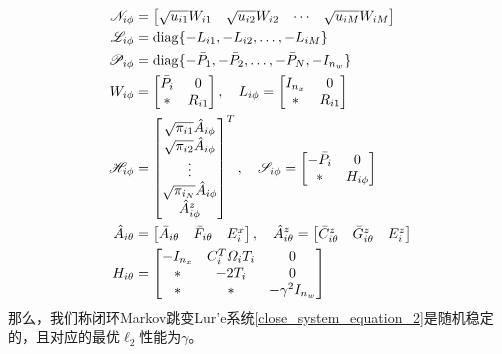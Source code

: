 	\begin{equation}\notag
	\begin{aligned}
	\mathscr{N}_{i\phi}&=\begin{bmatrix}
	\sqrt{u_{i1}}W_{i1}&\sqrt{u_{i2}}W_{i2}&\cdots&\sqrt{u_{iM}}W_{iM}
	\end{bmatrix}\\
	\mathscr{L}_{i\phi}&=\mathrm{diag} \{-L_{i1},-L_{i2},\dots,-L_{iM}  \}\\
	\mathscr{P}_{i\phi}&=\mathrm{diag}\{-\bar{P}_{1},-\bar{P}_{2},\dots,-\bar{P}_{N},-I_{n_w}  \}\\
	W_{i\phi}&=\begin{bmatrix}
	\bar{P}_{i}&0\\
	*&R_{i1}
	\end{bmatrix}, \quad
	L_{i\phi}=\begin{bmatrix}
	I_{n_x}&0\\
	*&R_{i1}
	\end{bmatrix}\\
	\mathscr{H}_{i\phi}&=\begin{bmatrix}
	\sqrt{\pi_{i1}}\hat{A}_{i\phi}\\
	\sqrt{\pi_{i2}}\hat{A}_{i\phi}\\
	\vdots\\
	\sqrt{\pi_{i_N}}\hat{A}_{i\phi}\\
	\hat{A}^{z}_{i\phi}
	\end{bmatrix}^{T}, \quad
	\mathscr{S}_{i\phi}=\begin{bmatrix}
	-\bar{P}_{i}&0\\
	*&H_{i\phi}
	\end{bmatrix}\\
	\hat{A}_{i\theta}&=\begin{bmatrix}
	\bar{A}_{i\theta}&\bar{F}_{i\theta}&E^{x}_{i}
	\end{bmatrix},\quad
	\hat{A}^{z}_{i\theta}=\begin{bmatrix}
	\bar{C}^{z}_{i\theta}&\bar{G}^{z}_{i\theta}&E^{z}_{i}
	\end{bmatrix}  \\
	H_{i\theta}&=\begin{bmatrix}
	-I_{n_x}&C^{T}_{i}\varOmega_{i}T_{i}&0\\
	*&-2T_{i}&0\\
	*&*&-\gamma^{2}I_{n_w}
	\end{bmatrix}
	\end{aligned}
	\end{equation}
	那么，我们称闭环Markov跳变Lur'e系统\eqref{close_system_equation_2}是随机稳定的，且对应的最优$\ell_2$性能为$\gamma$。
	
